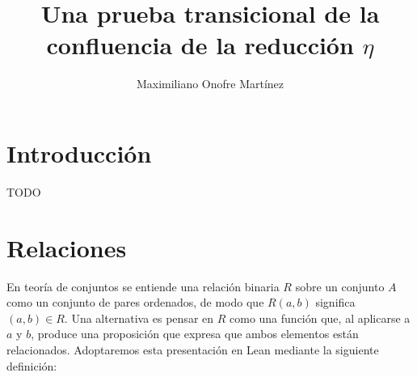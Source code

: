 \documentclass[
  spanish,
  letterpaper,
  DIV=11,
  numbers=noendperiod]{scrreprt}
\title{Una prueba transicional de la confluencia de la reducción
\(\eta\)}
\author{Maximiliano Onofre Martínez}
\date{}
\renewcommand*\contentsname{Tabla de contenidos}
\newcommand\contentsname{Tabla de contenidos}
\theoremstyle{remark}
\begin{document}
\maketitle

\theoremstyle{definition}
\newtheorem*{thm}{Theorem}
\newcommand{\thmnm}{Theorem}
\newtheorem*{namedthm}{\thmnm}
\newtheorem*{dfn}{Definition}
\newcommand{\defnm}{Definition}
\newtheorem*{nameddfn}{\defnm}

\newenvironment{nthm}[1]
  {\renewcommand{\thmnm}{#1}\begin{namedthm}}
  {\end{namedthm}}

\newenvironment{ndfn}[1]
  {\renewcommand{\defnm}{#1}\begin{nameddfn}}
  {\end{nameddfn}}

\newenvironment{npf}[1]
  {\begin{proof}[#1]}
  {\end{proof}}


\let\oldgreater\textgreater
\renewcommand{\textgreater}{\null\oldgreater}   %

\renewcommand*\contentsname{Tabla de contenidos}
{
\setcounter{tocdepth}{1}
\tableofcontents
}


\chapter*{Introducción}\label{introducciuxf3n}



TODO


\chapter{Relaciones}\label{relaciones}

En teoría de conjuntos se entiende una relación binaria \(R\) sobre un
conjunto \(A\) como un conjunto de pares ordenados, de modo que
\(R(a,b)\) significa \((a,b) \in R\). Una alternativa es pensar en \(R\)
como una función que, al aplicarse a \(a\) y \(b\), produce una
proposición que expresa que ambos elementos están relacionados.
Adoptaremos esta presentación en Lean mediante la siguiente definición:
\end{document}
